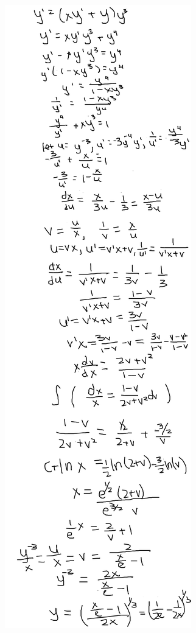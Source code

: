 \documentclass{article}
\begin{document}
\includegraphics[width=\textwidth,height=\textheight,keepaspectratio]{ams361q24.png}\clearpage{}
\end{document}
